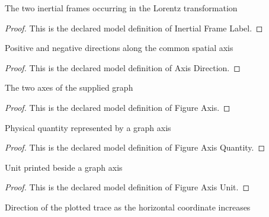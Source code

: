 \begin{definition}
  \label{def:physics:phyx-mini-0598:phyxminiproblems-problemphyxmini0598-inertialframelabel}
  The two inertial frames occurring in the Lorentz transformation
\end{definition}
\begin{proof}
  This is the declared model definition of Inertial Frame Label.
\end{proof}
\begin{definition}
  \label{def:physics:phyx-mini-0598:phyxminiproblems-problemphyxmini0598-axisdirection}
  Positive and negative directions along the common spatial axis
\end{definition}
\begin{proof}
  This is the declared model definition of Axis Direction.
\end{proof}
\begin{definition}
  \label{def:physics:phyx-mini-0598:phyxminiproblems-problemphyxmini0598-figureaxis}
  The two axes of the supplied graph
\end{definition}
\begin{proof}
  This is the declared model definition of Figure Axis.
\end{proof}
\begin{definition}
  \label{def:physics:phyx-mini-0598:phyxminiproblems-problemphyxmini0598-figureaxisquantity}
  Physical quantity represented by a graph axis
\end{definition}
\begin{proof}
  This is the declared model definition of Figure Axis Quantity.
\end{proof}
\begin{definition}
  \label{def:physics:phyx-mini-0598:phyxminiproblems-problemphyxmini0598-figureaxisunit}
  Unit printed beside a graph axis
\end{definition}
\begin{proof}
  This is the declared model definition of Figure Axis Unit.
\end{proof}
\begin{definition}
  \label{def:physics:phyx-mini-0598:phyxminiproblems-problemphyxmini0598-tracedirection}
  Direction of the plotted trace as the horizontal coordinate increases
\end{definition}
